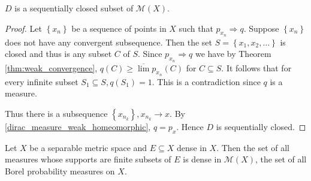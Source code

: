 \begin{lem}
	\( D \) is a sequentially closed subset of \( \mathscr { M } ( X ) \).
\end{lem}

\begin{proof}
	Let \( \left\{ x _ { n } \right\} \) be a sequence of points in \( X \) such that \( p _ { x _ { n } } \Rightarrow q \). Suppose \( \left\{ x _ { n } \right\} \) does not have any convergent subsequence. Then the set \( S = \left\{ x _ { 1 } , x _ { 2 } , \ldots \right\} \) is closed and thus is any subset \( C \) of \( S . \) Since \( p _ { x _ { n } } \Rightarrow q \) we have by Theorem \cref{thm:weak_convergence}, \( q ( C ) \geqslant \overline { \lim } p _ { x _ { n } } ( C ) \) for \( C \subseteq S \). It follows that for every infinite subset \( S _ { 1 } \subseteq S , q \left( S _ { 1 } \right) = 1 \). This is a contradiction since \( q \) is a measure.

	Thus there is a subsequence \( \left\{ x _ { n _ { k } } \right\} , x _ { n _ { k } } \rightarrow x . \) By \cref{dirac_measure_weak_homeomorphic}, \( q = p _ { x } \). Hence \( D \) is sequentially closed.
\end{proof}

\begin{thm}
	\label{finite_support_approximation}
	Let \( X \) be a separable metric space and \( E \subseteq X \) dense in \( X  \). Then the set of all measures whose supports are finite subsets of \( E \) is dense in \( \mathscr{ M } ( X ) \), the set of all Borel probability measures on $X$.
\end{thm}

